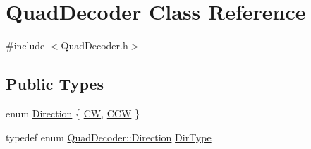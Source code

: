 \hypertarget{class_quad_decoder}{
\section{QuadDecoder Class Reference}
\label{class_quad_decoder}
}


{\ttfamily \#include $<$QuadDecoder.h$>$}

\subsection*{Public Types}
\begin{DoxyCompactItemize}
\item 
enum \hyperlink{class_quad_decoder_a805019bcc799d481dbab005ab251b4db}{Direction} \{ \hyperlink{class_quad_decoder_a805019bcc799d481dbab005ab251b4dba292c7e620cba2cad448fed305ef93151}{CW}, 
\hyperlink{class_quad_decoder_a805019bcc799d481dbab005ab251b4dba83a029d235cca29011beddfa493646d3}{CCW}
 \}
\item 
typedef enum \hyperlink{class_quad_decoder_a805019bcc799d481dbab005ab251b4db}{QuadDecoder::Direction} \hyperlink{class_quad_decoder_a63a55fea541c4a30ebb12bcfa21359a3}{DirType}
\end{DoxyCompactItemize}
